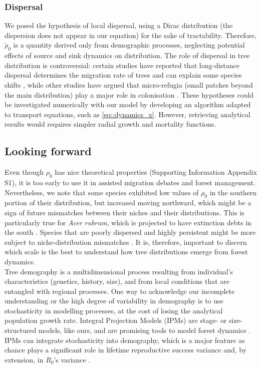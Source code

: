 \subsubsection{Dispersal}
We posed the hypothesis of local dispersal, using a Dirac distribution (\ie the dispersion does not appear in our equation) for the sake of tractability. Therefore, $ \tilde \rho_0 $ is a quantity derived only from demographic processes, neglecting potential effects of source and sink dynamics on distribution. The role of dispersal in tree distribution is controversial: certain studies have reported that long-distance dispersal determines the migration rate of trees and can explain some species shifts \citep[and references therein]{Nathan2002}, while other studies have argued that micro-refugia (small patches beyond the main distribution) play a major role in colonisation \citep[and references therein]{Feurdean2013}. These hypotheses could be investigated numerically with our model by developing an algorithm adapted to transport equations, such as \eqref{eq::dynamics_x}. However, retrieving analytical results would requires simpler radial growth and mortality functions.

\subsection{Looking forward}
Even though $ \rho_0 $ has nice theoretical properties (Supporting Information Appendix S1), it is too early to use it in assisted migration debates and forest management. Nevertheless, we note that some species exhibited low values of $ \rho_0 $ in the southern portion of their distribution, but increased moving northward, which might be a sign of future mismatches between their niches and their distributions. This is particularly true for \textit{Acer rubrum}, which is projected to have extinction debts in the south \citep{Talluto2017a}. Species that are poorly dispersed and highly persistent might be more subject to niche-distribution mismatches \citep[on shrubs, not trees, in the family Proteaceae in South Africa]{Pagel2020}. It is, therefore, important to discern which scale is the best to understand how tree distributions emerge from forest dynamics. \\

Tree demography is a multidimensional process resulting from individual's characteristics (\eg genetics, history, size), and from local conditions that are entangled with regional processes. One way to acknowledge our incomplete understanding or the high degree of variability in demography is to use stochasticity in modelling processes, at the cost of losing the analytical population growth rate. Integral Projection Models (IPMs) are stage- or size-structured models, like ours, and are promising tools to model forest dynamics \citep{Vindenes2012, Kunstler2019, Merow2014}. IPMs can integrate stochasticity into demography, which is a major feature as chance plays a significant role in lifetime reproductive success variance and, by extension, in $ R_0 $'s variance \citep{Snyder2016, Snyder2018}.

